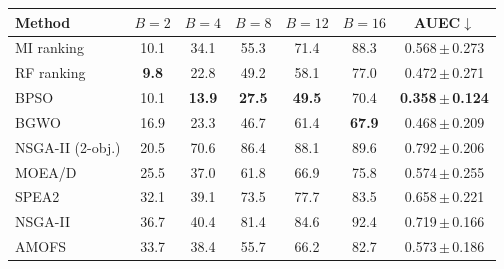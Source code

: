 \begin{tabular}{lcccccc}
\toprule
Method & $B=2$ & $B=4$ & $B=8$ & $B=12$ & $B=16$ & AUEC$\downarrow$ \\
\midrule
MI ranking & 10.1 & 34.1 & 55.3 & 71.4 & 88.3 & 0.568\,$\pm$\,0.273 \\
RF ranking & \textbf{9.8} & 22.8 & 49.2 & 58.1 & 77.0 & 0.472\,$\pm$\,0.271 \\
BPSO & 10.1 & \textbf{13.9} & \textbf{27.5} & \textbf{49.5} & 70.4 & \textbf{0.358\,$\pm$\,0.124} \\
BGWO & 16.9 & 23.3 & 46.7 & 61.4 & \textbf{67.9} & 0.468\,$\pm$\,0.209 \\
NSGA-II (2-obj.) & 20.5 & 70.6 & 86.4 & 88.1 & 89.6 & 0.792\,$\pm$\,0.206 \\
MOEA/D & 25.5 & 37.0 & 61.8 & 66.9 & 75.8 & 0.574\,$\pm$\,0.255 \\
SPEA2 & 32.1 & 39.1 & 73.5 & 77.7 & 83.5 & 0.658\,$\pm$\,0.221 \\
NSGA-II & 36.7 & 40.4 & 81.4 & 84.6 & 92.4 & 0.719\,$\pm$\,0.166 \\
AMOFS & 33.7 & 38.4 & 55.7 & 66.2 & 82.7 & 0.573\,$\pm$\,0.186 \\
\bottomrule
\end{tabular}
